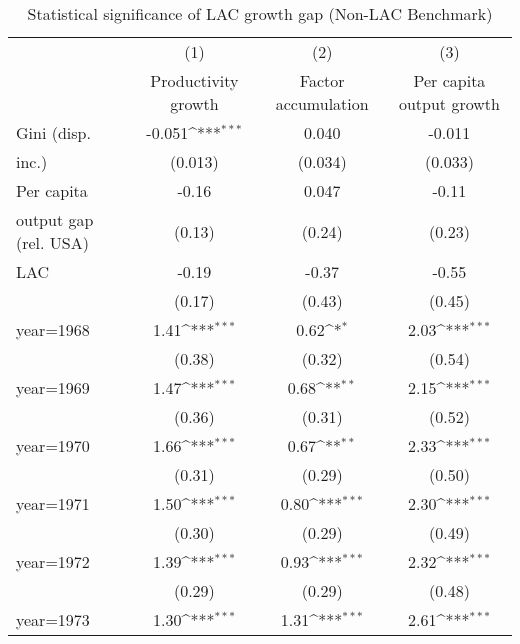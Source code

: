 \begin{sidewaystable}[htbp]\centering
\def\sym#1{\ifmmode^{#1}\else\(^{#1}\)\fi}
\caption{Statistical significance of LAC growth gap (Non-LAC Benchmark)}
\begin{tabular}{l*{3}{c}}
\toprule
                &\multicolumn{1}{c}{(1)}&\multicolumn{1}{c}{(2)}&\multicolumn{1}{c}{(3)}\\
                &\multicolumn{1}{c}{Productivity growth}&\multicolumn{1}{c}{Factor accumulation}&\multicolumn{1}{c}{Per capita output growth}\\
\midrule
Gini (disp.     &   -0.051\sym{***}&    0.040         &   -0.011         \\
inc.)           &  (0.013)         &  (0.034)         &  (0.033)         \\
\addlinespace
Per capita      &    -0.16         &    0.047         &    -0.11         \\
output gap (rel. USA)&   (0.13)         &   (0.24)         &   (0.23)         \\
\addlinespace
LAC             &    -0.19         &    -0.37         &    -0.55         \\
                &   (0.17)         &   (0.43)         &   (0.45)         \\
\addlinespace
year=1968       &     1.41\sym{***}&     0.62\sym{*}  &     2.03\sym{***}\\
                &   (0.38)         &   (0.32)         &   (0.54)         \\
\addlinespace
year=1969       &     1.47\sym{***}&     0.68\sym{**} &     2.15\sym{***}\\
                &   (0.36)         &   (0.31)         &   (0.52)         \\
\addlinespace
year=1970       &     1.66\sym{***}&     0.67\sym{**} &     2.33\sym{***}\\
                &   (0.31)         &   (0.29)         &   (0.50)         \\
\addlinespace
year=1971       &     1.50\sym{***}&     0.80\sym{***}&     2.30\sym{***}\\
                &   (0.30)         &   (0.29)         &   (0.49)         \\
\addlinespace
year=1972       &     1.39\sym{***}&     0.93\sym{***}&     2.32\sym{***}\\
                &   (0.29)         &   (0.29)         &   (0.48)         \\
\addlinespace
year=1973       &     1.30\sym{***}&     1.31\sym{***}&     2.61\sym{***}\\

\end{tabular}
\end{sidewaystable}
